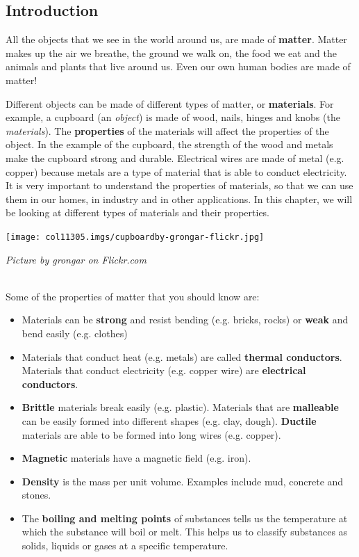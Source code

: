             \subsection{ Introduction}
            \nopagebreak
            \label{m38708*id62175}All the objects that we see in the world around us, are made of \textbf{matter}. Matter makes up the air we breathe, the ground we walk on, the food we eat and the animals and plants that live around us. Even our own human bodies are made of matter!\par 
\begin{minipage}{.5\textwidth}
      \label{m38708*id62185}Different objects can be made of different types of matter, or \textbf{materials}. For example, a cupboard (an \textsl{object}) is made of wood, nails, hinges and knobs (the \textsl{materials}). The \textbf{properties} of the materials will affect the properties of the object. In the example of the cupboard, the strength of the wood and metals make the cupboard strong and durable. Electrical wires are made of metal (e.g. copper) because metals are a type of material that is able to conduct electricity. It is very important to understand the properties of materials, so that we can use them in our homes, in industry and in other applications. In this chapter, we will be looking at different types of materials and their properties.\par 
\end{minipage}
\begin{minipage}{.5\textwidth}
\begin{center}
 \texttt{[image: col11305.imgs/cupboardby-grongar-flickr.jpg]}\par
\textit{Picture by grongar on Flickr.com}
\end{center}
\end{minipage} \\
\label{m38708*id0132}Some of the properties of matter that you should know are:
\label{m38708*lid825}\begin{itemize}[noitemsep]
  \item Materials can be \textbf{strong} and resist bending (e.g. bricks, rocks) or \textbf{weak} and bend easily (e.g. clothes)
  \item Materials that conduct heat (e.g. metals) are called \textbf{thermal conductors}. Materials that conduct electricity (e.g. copper wire) are \textbf{electrical conductors}.
  \item \textbf{Brittle} materials break easily (e.g. plastic). Materials that are \textbf{malleable} can be easily formed into different shapes (e.g. clay, dough). \textbf{Ductile} materials are able to be formed into long wires (e.g. copper).
  \item \textbf{Magnetic} materials have a magnetic field (e.g. iron).
  \item \textbf{Density} is the mass per unit volume. Examples include mud, concrete and stones.
  \item The \textbf{boiling and melting points} of substances tells us the temperature at which the substance will boil or melt. This helps us to classify substances as solids, liquids or gases at a specific temperature.\end{itemize}
